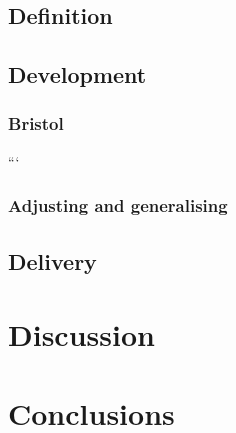 \documentclass[preprint, 3p,
authoryear]{elsarticle} %
\begin{document}
\subsection{Definition}\label{definition}

\subsection{Development}\label{development}

\subsubsection{Bristol}\label{bristol}

```

\subsubsection{Adjusting and
generalising}\label{adjusting-and-generalising}

\subsection{Delivery}\label{delivery}

\section{Discussion}\label{discussion}

\section{Conclusions}\label{conclusions}
\end{document}
